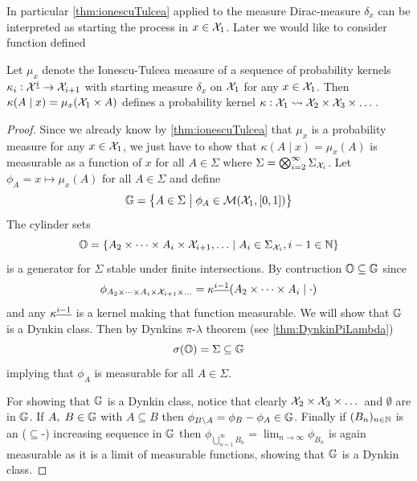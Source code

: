 In particular \cref{thm:ionescuTulcea} applied to the measure Dirac-measure
$\delta_x$ can be interpreted as starting the process in $x \in \mathcal{X}_1$.
Later we would like to consider function defined

\begin{prop}
  Let $\mu_x$ denote the Ionescu-Tulcea measure of a
  sequence of probability kernels
  $\kappa_i : \mathcal{X}^{\underline{i}} \to \mathcal{X}_{i+1}$
  with starting measure $\delta_x$ on $\mathcal{X}_1$ for any $x \in \mathcal{X}_1$.
  Then $\kappa(A \mid x) = \mu_x(\mathcal{X}_1 \times A)$ defines a probability kernel
  $\kappa : \mathcal{X}_1 \leadsto \mathcal{X}_2 \times \mathcal{X}_3 \times \dots$.
\end{prop}
\begin{proof}
  Since we already know by \cref{thm:ionescuTulcea}
  that $\mu_x$ is a probability measure for any
  $x \in \mathcal{X}_1$,
  we just have to show that $\kappa(A \mid x) = \mu_x(A)$ is measurable
  as a function of $x$ for all
  $A \in \Sigma$ where $\Sigma = \bigotimes_{i=2}^\infty \Sigma_{\mathcal{X}_i}$.
  Let $\phi_A = x \mapsto \mu_x(A)$
  for all $A \in \Sigma$ and define
  \[ \mathbb{G} = \left\{ A \in \Sigma
  \;\middle\vert\; \phi_A \in \mathcal{M}(\mathcal{X}_1, [0,1]) \right\} \]
  The cylinder sets
  \[ \mathbb{O} = \left\{ A_2 \times \dots \times A_i \times \mathcal{X}_{i+1},
  \dots \;\middle\vert\; A_i \in \Sigma_{\mathcal{X}_i}, i-1 \in \mathbb{N} \right\} \]
  is a generator for $\Sigma$ stable under 
  finite intersections.
  By contruction $\mathbb{O} \subseteq \mathbb{G}$ since
  \[ \phi_{A_2 \times \dots \times A_i \times \mathcal{X}_{i+1} \times \dots}
  = \kappa^{\underline{i-1}}(A_2 \times \dots \times A_i \mid \cdot) \]
  and any $\kappa^{\underline{i-1}}$ is a kernel making that function measurable.
  We will show that $\mathbb{G}$ is a Dynkin class.
  Then by Dynkins $\pi$-$\lambda$ theorem (see \cref{thm:DynkinPiLambda})
  \[ \sigma(\mathbb{O}) = \Sigma
  \subseteq \mathbb{G} \]
  implying that $\phi_A$ is measurable
  for all $A \in \Sigma$.
  
  For showing that $\mathbb{G}$ is a Dynkin class, notice that
  clearly $\mathcal{X}_2 \times \mathcal{X}_3 \times \dots$ and $\emptyset$
  are in $\mathbb{G}$.
  If $A,\; B \in \mathbb{G}$ with $A \subseteq B$ then
  $\phi_{B \setminus A} = \phi_B - \phi_A \in \mathbb{G}$.
  Finally if $(B_n)_{n \in \mathbb{N}}$ is an ($\subseteq$-) increasing sequence
  in $\mathbb{G}$ then $\phi_{\bigcup_{n=1}^\infty B_n} =
  \lim_{n \to \infty} \phi_{B_n}$ is again measurable as it is a
  limit of measurable functions, showing that $\mathbb{G}$ is a Dynkin class.
\end{proof}

